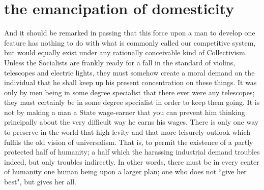 \documentclass[final,10pt,letterpaper,twocolumn,openany]{book}
\begin{document}
\section{the emancipation of domesticity}

     And it should be remarked in passing that this force upon a man to
develop one feature has nothing to do with what is commonly called our
competitive system, but would equally exist under any rationally
conceivable kind of Collectivism. Unless the Socialists are frankly ready
for a fall in the standard of violins, telescopes and electric lights, they
must somehow create a moral demand on the individual that he shall keep
up his present concentration on these things. It was only by men being in
some degree specialist that there ever were any telescopes; they must
certainly be in some degree specialist in order to keep them going. It is not
by making a man a State wage-earner that you can prevent him thinking
principally about the very difficult way he earns his wages. There is only
one way to preserve in the world that high levity and that more leisurely
outlook which fulfils the old vision of universalism. That is, to permit the
existence of a partly protected half of humanity; a half which the harassing
industrial demand troubles indeed, but only troubles indirectly. In other
words, there must be in every center of humanity one human being upon a
larger plan; one who does not ``give her best", but gives her all.
\end{document}
